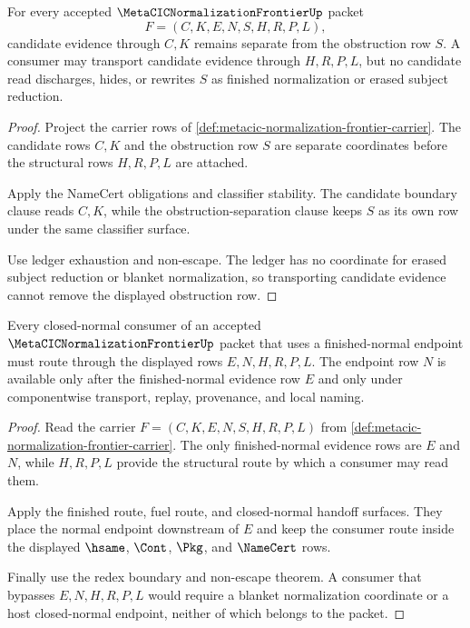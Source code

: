 \begin{theorem}
\label{thm:metacic-normalization-frontier-candidate-obstruction-separation}
For every accepted $\MetaCICNormalizationFrontierUp$ packet
$$
F=(C,K,E,N,S,H,R,P,L),
$$
candidate evidence through $C,K$ remains separate from the obstruction row $S$. A consumer may transport candidate evidence through $H,R,P,L$, but no candidate read discharges, hides, or rewrites $S$ as finished normalization or erased subject reduction.
\end{theorem}
\begin{proof}
Project the carrier rows of \autoref{def:metacic-normalization-frontier-carrier}. The candidate rows $C,K$ and the obstruction row $S$ are separate coordinates before the structural rows $H,R,P,L$ are attached.

Apply the NameCert obligations and classifier stability. The candidate boundary clause reads $C,K$, while the obstruction-separation clause keeps $S$ as its own row under the same classifier surface.

Use ledger exhaustion and non-escape. The ledger has no coordinate for erased subject reduction or blanket normalization, so transporting candidate evidence cannot remove the displayed obstruction row.
\end{proof}

\begin{theorem}
\label{thm:metacic-normalization-frontier-closed-normal-consumer-route}
Every closed-normal consumer of an accepted $\MetaCICNormalizationFrontierUp$ packet that uses a finished-normal endpoint must route through the displayed rows $E,N,H,R,P,L$. The endpoint row $N$ is available only after the finished-normal evidence row $E$ and only under componentwise transport, replay, provenance, and local naming.
\end{theorem}
\begin{proof}
Read the carrier $F=(C,K,E,N,S,H,R,P,L)$ from \autoref{def:metacic-normalization-frontier-carrier}. The only finished-normal evidence rows are $E$ and $N$, while $H,R,P,L$ provide the structural route by which a consumer may read them.

Apply the finished route, fuel route, and closed-normal handoff surfaces. They place the normal endpoint downstream of $E$ and keep the consumer route inside the displayed $\hsame$, $\Cont$, $\Pkg$, and $\NameCert$ rows.

Finally use the redex boundary and non-escape theorem. A consumer that bypasses $E,N,H,R,P,L$ would require a blanket normalization coordinate or a host closed-normal endpoint, neither of which belongs to the packet.
\end{proof}

